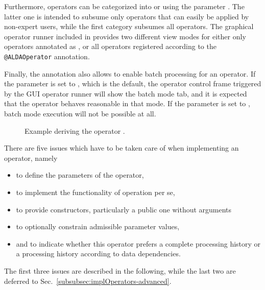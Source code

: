 Furthermore, operators can be categorized into 
or  using the parameter .
The latter one is intended to subsume only operators that can easily be applied by non-expert users,
while the first category subsumes all operators. The graphical operator runner included in \alida 
provides two different view modes for either only operators annotated as
, or all operators registered according to the
\texttt{@ALDAOperator} annotation.

Finally, the annotation also allows to enable batch
processing for an operator. If the parameter  is set to ,
which is the default, the operator control frame triggered by the GUI operator
runner will show the batch mode tab, and it is expected that the operator
behaves reasonable in that mode. If the parameter is set to
, batch mode execution will not be possible at all.

\begin{figure}[h]

\caption{\label{exa:defineOp}Example deriving the operator .}
\end{figure}

There are five issues which have to be taken care of when implementing
an operator, namely
\begin{itemize}
\item	to define the parameters of the operator,
\item	to implement the functionality of operation per se,
\item 	to provide constructors, particularly a public one without arguments
\item	to optionally constrain admissible parameter values,
\item 	and to indicate whether
          this operator prefers a complete processing history
	or a processing history according to data dependencies.
\end{itemize}
The first three issues
are described in the following,
while the last two are deferred to Sec.~\ref{subsubsec:implOperators-advanced}.

